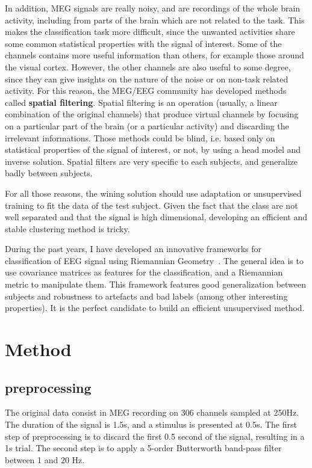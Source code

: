\documentclass[11pt,a4paper]{article}
\begin{document}
In addition, MEG signals are really noisy, and are recordings of the whole brain activity, including from parts of the brain which are not related to the task. This makes the classification task more difficult, since the unwanted activities share some common statistical properties with the signal of interest. Some of the channels contains more useful information than others, for example those around the visual cortex. However, the other channels are also useful to some degree, since they can give insights on the nature of the noise or on non-task related activity. For this reason, the MEG/EEG community has developed methods called \textbf{spatial filtering}. Spatial filtering is an operation (usually, a linear combination of the original channels) that produce virtual channels by focusing on a particular part of the brain (or a particular activity) and discarding the irrelevant informations. Those methods could be blind, i.e. based only on statistical properties of the signal of interest, or not, by using a head model and inverse solution.
Spatial filters are very specific to each subjects, and generalize badly between subjects.

For all those reasons, the wining solution should use adaptation or unsupervised training to fit the data of the test subject. Given the fact that the class are not well separated and that the signal is high dimensional, developing an efficient and stable clustering method is tricky.

During the past years, I have developed an innovative frameworks for classification of EEG signal using Riemannian Geometry~\cite{TBME,NEUROCOMP,Axiv1}. The general idea is to use covariance matrices as features for the classification, and a Riemannian metric to manipulate them. This framework features good generalization between subjects and robustness to artefacts and bad labels (among other interesting properties). It is the perfect candidate to build an efficient unsupervised method.

\section{Method}
\subsection{preprocessing}
The original data consist in MEG recording on 306 channels sampled at 250Hz. The duration of the signal is 1.5s, and a stimulus is presented at 0.5s. The first step of preprocessing is to discard the first 0.5 second of the signal, resulting in a 1s trial. The second step is to apply a 5-order Butterworth band-pass filter between 1 and 20 Hz.
\end{document}
